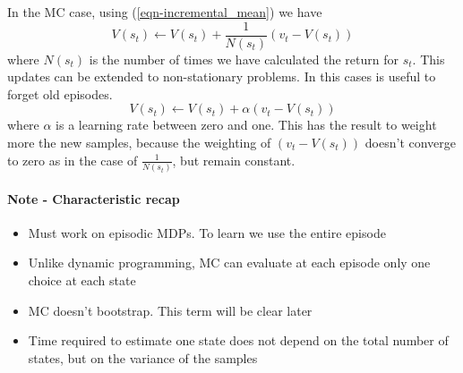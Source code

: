 \documentclass[main.tex]{subfiles}
\begin{document}
In the MC case, using (\ref{eqn-incremental_mean}) we have
\begin{equation}
    V(s_t) \leftarrow V(s_t) + \frac{1}{N(s_t)}(v_t-V(s_t))
\end{equation}
where $N(s_t)$ is the number of times we have calculated the return for $s_t$.
This updates can be extended to non-stationary problems. In this cases is useful to forget old episodes.
\begin{equation}
    V(s_t) \leftarrow V(s_t) + \alpha(v_t-V(s_t))
\end{equation}
where $\alpha$ is a learning rate between zero and one. This has the result to weight more the new samples, because the weighting of $(v_t-V(s_t))$ doesn't converge to zero as in the case of $\frac{1}{N(s_t)}$, but remain constant.
\paragraph{Note - Characteristic recap}
\begin{itemize}
    \item Must work on episodic MDPs. To learn we use the entire episode
    \item Unlike dynamic programming, MC can evaluate at each episode only one choice at each state
    \item MC doesn't bootstrap. This term will be clear later
    \item Time required to estimate one state does not depend on the total number of states, but on the variance of the samples
\end{itemize}
\newpage
\end{document}
